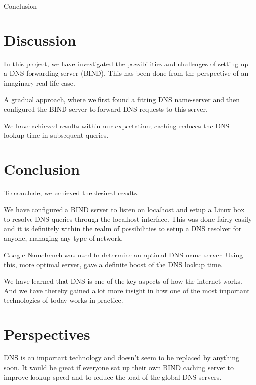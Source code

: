 {Conclusion}
\section{Discussion}
In this project, we have investigated the possibilities and challenges of setting up a DNS forwarding server (BIND). This has been done from the perspective of an imaginary real-life case. 

A gradual approach, where we first found a fitting DNS name-server and then configured the BIND server to forward DNS requests to this server. 

We have achieved results within our expectation; caching reduces the DNS lookup time in subsequent queries. 

\section{Conclusion}
To conclude, we achieved the desired results. 

We have configured a BIND server to listen on localhost and setup a Linux box to resolve DNS queries through the localhost interface. 
This was done fairly easily and it is definitely within the realm of possibilities to setup a DNS resolver for anyone, managing any type of network. 

Google Namebench was used to determine an optimal DNS name-server. Using this, more optimal server, gave a definite boost of the DNS lookup time.

We have learned that DNS is one of the key aspects of how the internet works. And we have thereby gained a lot more insight in how one of the most important technologies of today works in practice.

\section{Perspectives}
DNS is an important technology and doesn't seem to be replaced by anything soon. It would be great if everyone sat up their own BIND caching server to improve lookup speed and to reduce the load of the global DNS servers.
